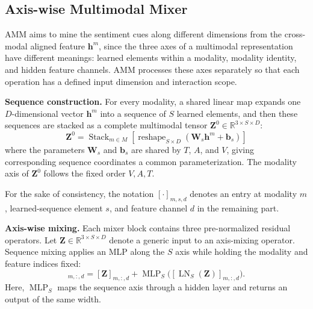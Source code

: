 \documentclass[letterpaper]{article} %
\begin{document}
\subsection{Axis-wise Multimodal Mixer}
AMM aims to mine the sentiment cues along different dimensions from the cross-modal aligned feature $\mathbf{h}^{m}$, since the three axes of a multimodal representation have different meanings: learned elements within a modality, modality identity, and hidden feature channels. AMM processes these axes separately so that each operation has a defined input dimension and interaction scope.



\noindent\textbf{Sequence construction.} For every modality, a shared linear map expands one $D$-dimensional vector $\mathbf{h}^{m}$ into a sequence of $S$ learned elements, and then these sequences are stacked as a complete multimodal tensor $\mathbf{Z}^{0}\in\mathbb{R}^{3\times S\times D}$:
\begin{equation}
\mathbf{Z}^{0} =\operatorname{Stack}_{m\in M}
  \left[
  \operatorname{reshape}_{S\times D}
  (\mathbf{W}_{s}\mathbf{h}^{m}+\mathbf{b}_{s})
  \right]
\label{eq:sequence_construction}
\end{equation}
where the parameters $\mathbf{W}_{s}$ and $\mathbf{b}_{s}$ are shared by
$T$, $A$, and $V$, giving corresponding sequence coordinates a common
parameterization. The modality axis of $\mathbf{Z}^{0}$ follows the
fixed order $V,A,T$.

For the sake of consistency, the notation $[\cdot]_{m,s,d}$ denotes an
entry at modality $m$, learned-sequence element $s$, and feature channel
$d$ in the remaining part. 

\noindent\textbf{Axis-wise mixing.}
Each mixer block contains three pre-normalized residual operators. Let $\mathbf{Z}\in\mathbb{R}^{3\times S\times D}$ denote a generic input to an axis-mixing operator. Sequence mixing applies an MLP along the $S$ axis while holding the modality and feature indices fixed:
\begin{equation}
[\mathcal{S}(\mathbf{Z})]_{m,:,d}
=[\mathbf{Z}]_{m,:,d}
+\operatorname{MLP}_{S}
  \bigl([\operatorname{LN}_{S}(\mathbf{Z})]_{m,:,d}\bigr).
\label{eq:sequence_mixing}
\end{equation}
Here, $\operatorname{MLP}_{S}$ maps the sequence axis through a hidden
layer and returns an output of the same width.
\end{document}
